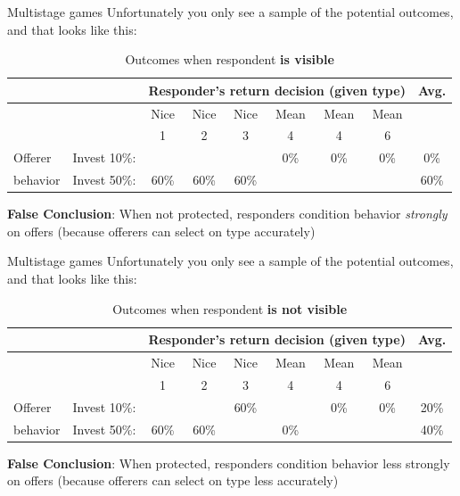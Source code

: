 \documentclass[
  11pt,
  ignorenonframetext,
]{beamer}
\begin{document}
\begin{frame}{Multistage games}
\protect\hypertarget{multistage-games-3}{}
Unfortunately you only see a sample of the potential outcomes, and that
looks like this:

\begin{table}[h!] \scriptsize
  \centering
  \caption{Outcomes when respondent \textbf{is visible}}
    \begin{tabular}{ll|cccccc|c} \footnotesize
          &       & \multicolumn{6}{c}{Responder's return decision (given type)}& Avg.   \\ \hline
          &       & Nice  & Nice  & Nice  & Mean  & Mean  & Mean  \\ 
                    & & 1&2&3&4&4&6\\ \hline \hline  
    Offerer  & Invest 10\%: &       &       &       & 0\%   & 0\%   & 0\% & 0\%\\
    behavior      & Invest 50\%: & 60\% & 60\% & 60\% &       &    &   &  60\% \\
    \end{tabular}
\end{table}

\textbf{False Conclusion}: When not protected, responders condition
behavior \textit{strongly} on offers (because offerers can select on
type accurately)
\end{frame}

\begin{frame}{Multistage games}
\protect\hypertarget{multistage-games-4}{}
Unfortunately you only see a sample of the potential outcomes, and that
looks like this:

\begin{table}[h!] \scriptsize
  \centering
  \caption{Outcomes when respondent \textbf{is not visible}}
    \begin{tabular}{ll|cccccc|c} \footnotesize
          &       & \multicolumn{6}{c}{Responder's return decision (given type)} & Avg.  \\ \hline
          &       & Nice  & Nice  & Nice  & Mean  & Mean  & Mean  \\ 
                    & & 1&2&3&4&4&6\\ \hline \hline  
    Offerer         & Invest 10\%: &        &       &    60\%   &    & 0\%   &      0\% & 20\%\\
    behavior        & Invest 50\%: & 60\%   &  60\% &           & 0\%      &       &   &  40\%\\
    \end{tabular}
\end{table}

\textbf{False Conclusion}: When protected, responders condition behavior
less strongly on offers (because offerers can select on type less
accurately)
\end{frame}
\end{document}
